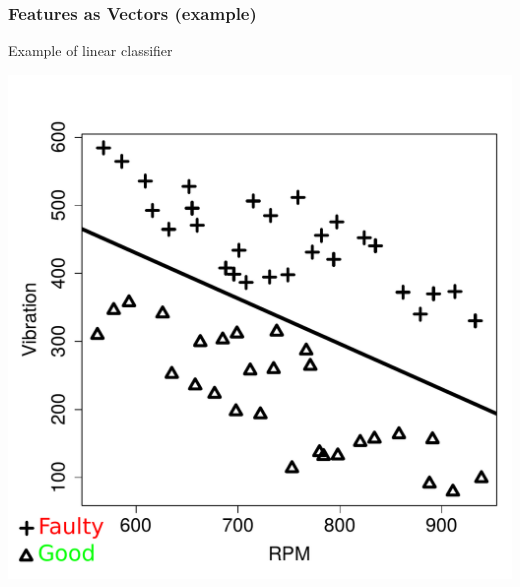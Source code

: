 \documentclass{beamer}
\begin{document}
\begin{frame}
  \frametitle{Features as Vectors (example)}
    Example of linear classifier 
  	\begin{center}
	\includegraphics[scale=0.38]{fmlpda_figure_7_10_b}
	\end{center}
\end{frame}
\end{document}
